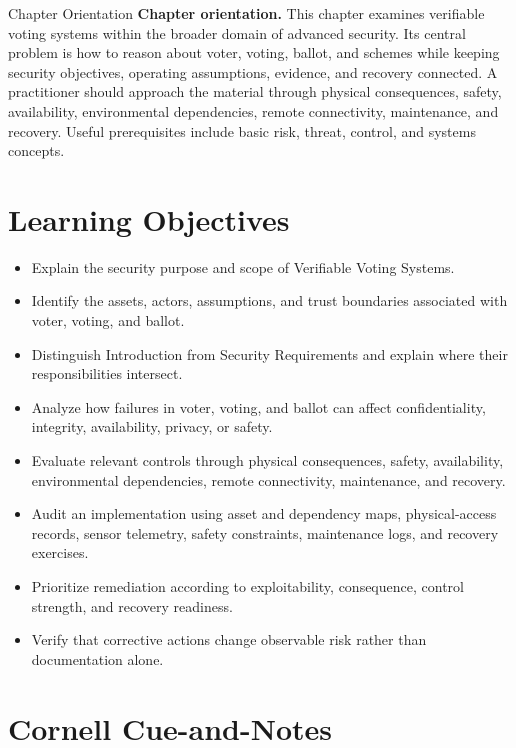 \documentclass[11pt,letterpaper]{article}
\title{\CornellDocumentTitle}
\author{}
\date{}
\begin{document}
\maketitle
\begin{CornellOverviewBox}{Chapter Orientation}
\textbf{Chapter orientation.} This chapter examines verifiable voting systems within the broader domain of advanced security. Its central problem is how to reason about voter, voting, ballot, and schemes while keeping security objectives, operating assumptions, evidence, and recovery connected. A practitioner should approach the material through physical consequences, safety, availability, environmental dependencies, remote connectivity, maintenance, and recovery. Useful prerequisites include basic risk, threat, control, and systems concepts.
\end{CornellOverviewBox}
\section*{Learning Objectives}
\begin{itemize}
\item Explain the security purpose and scope of Verifiable Voting Systems.
\item Identify the assets, actors, assumptions, and trust boundaries associated with voter, voting, and ballot.
\item Distinguish Introduction from Security Requirements and explain where their responsibilities intersect.
\item Analyze how failures in voter, voting, and ballot can affect confidentiality, integrity, availability, privacy, or safety.
\item Evaluate relevant controls through physical consequences, safety, availability, environmental dependencies, remote connectivity, maintenance, and recovery.
\item Audit an implementation using asset and dependency maps, physical-access records, sensor telemetry, safety constraints, maintenance logs, and recovery exercises.
\item Prioritize remediation according to exploitability, consequence, control strength, and recovery readiness.
\item Verify that corrective actions change observable risk rather than documentation alone.
\end{itemize}
\section*{Cornell Cue-and-Notes}
\end{document}
